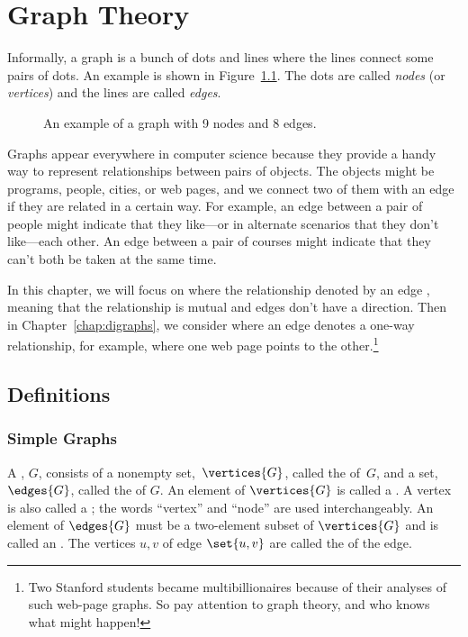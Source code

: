\chapter{Graph Theory}\label{chap:graph_theory}

Informally, a graph is a bunch of dots and lines where the lines
connect some pairs of dots.  An example is shown in
Figure~\ref{fig:graph-example}.  The dots are called \emph{nodes} (or
\emph{vertices}) and the lines are called \emph{edges}.

\begin{figure}[h]


\caption{An example of a graph with 9 nodes and 8 edges.}

\label{fig:graph-example}

\end{figure}

Graphs appear everywhere in computer science because they provide a handy
way to represent relationships between pairs of objects.  The objects
might be programs, people, cities, or web pages, and we connect two of
them with an edge if they are related in a certain way.  For example, an
edge between a pair of people might indicate that they like---or in
alternate scenarios that they don't like---each other.  An edge between a
pair of courses might indicate that they can't both be taken at the same
time.

In this chapter, we will focus on \emph{} where the
relationship denoted by an edge \emph{}, meaning that the
relationship is mutual and edges don't have a direction.  Then in
Chapter~\ref{chap:digraphs}, we consider \emph{}
where an edge denotes a one-way relationship, for example, where one web
page points to the other.\footnote{Two Stanford students became
  multibillionaires because of their analyses of such web-page graphs.  So
  pay attention to graph theory, and who knows what might happen!}

\section{Definitions}\label{degreessec}

\subsection{Simple Graphs}


\begin{definition}\label{graphdef}
  A , $G$, consists of a nonempty set,~$\vertices{G}$,
  called the  of~$G$, and a set, $\edges{G}$, called the
   of $G$.  An element of $\vertices{G}$ is called a
  .  A vertex is also called a ; the words
  ``vertex'' and ``node'' are used interchangeably.  An element of
  $\edges{G}$ must be a two-element subset of $\vertices{G}$ and is called
  an .  The vertices $u, v$ of edge $\set{u,v}$ are called the
   of the edge.
\end{definition}

